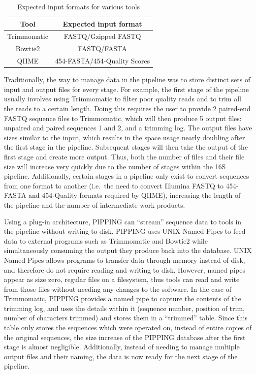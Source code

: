 \documentclass[12pt]{article}
\begin{document}
	\begin{table}
		\centering
		\begin{tabular}{cc}
		\toprule
		Tool & Expected input format\\
		\midrule
		Trimmomatic & FASTQ/Gzipped FASTQ\\
		Bowtie2 & FASTQ/FASTA\\
		QIIME & 454-FASTA/454-Quality Scores\\
		\bottomrule
		\end{tabular}
		\caption{Expected input formats for various tools}
		\label{tab:expected_input}
	\end{table}
	Traditionally, the way to manage data in the pipeline was to store distinct sets of input 
	and output files for every stage. For example, the first stage of 
	the pipeline usually involves using Trimmomatic to filter poor quality reads 
	and to trim all the reads to a certain length. Doing this requires the user to
	provide 2 paired-end FASTQ sequence files to Trimmomatic, which will then produce
	5 output files: unpaired and paired sequences 1 and 2, and a trimming log. The 
	output files have sizes similar to the input, which results in the space usage
	nearly doubling after the first stage in the pipeline. Subsequent stages will
	then take the output of the first stage and create more output. Thus, both
	the number of files and their file size will increase very quickly due to the 
	number of stages within the 16S pipeline. Additionally, certain stages in a pipeline only exist to convert sequences from 
	one format to another (i.e.\ the need to convert Illumina FASTQ to 454-FASTA and 
	454-Quality formats required by QIIME), increasing the length of the pipeline 
	and the number of intermediate work products.
	
	Using a plug-in architecture, PIPPING can ``stream'' sequence data to tools in the
	pipeline without writing to disk. PIPPING uses UNIX Named Pipes to feed data to 
	external programs such as Trimmomatic and Bowtie2 while simultaneously consuming 
	the output they produce back into the database. UNIX Named Pipes allows programs to transfer
	data through memory instead of disk, and therefore do not require reading and
	writing to disk. However, named pipes appear as size zero, regular files on a filesystem,
	thus tools can read and write from those files without needing any changes
	to the software. In the case of Trimmomatic, PIPPING provides a named pipe to capture
	the contents of the trimming log, and uses the details within it (sequence number, 
	position of trim, number of characters trimmed) and stores them in a ``trimmed''
	table. Since this table only stores the sequences which were operated on, instead 
	of entire copies of the original sequences, the size increase of the PIPPING database
	after the first stage is almost negligible. Additionally, instead of needing to
	manage multiple output files and their naming, the data is now ready for the 
	next stage of the pipeline.
\end{document}
